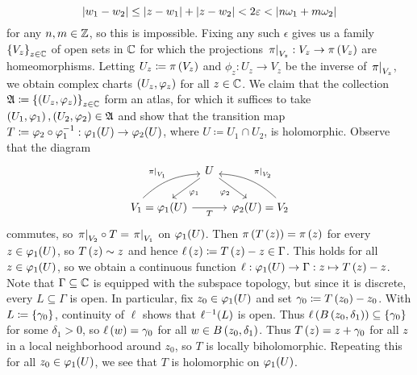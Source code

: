 \documentclass[../Moduli_Spaces_of_Riemann_Surfaces.tex]{subfiles}
\begin{document}
\begin{example}
\begin{equation*}
            \left|w_1-w_2\right|\leq\left|z-w_1\right|+\left|z-w_2\right|<2\varepsilon<\left|n\omega_1+m\omega_2\right|
        \end{equation*}
        for any $n,m\in\mathbb{Z}$, so this is impossible. Fixing any such $\epsilon$ gives us a family $\left\{V_z\right\}_{z\in\mathbb{C}}$ of open sets in $\mathbb{C}$ for which the projections $\left.\pi\right|_{V_z}:V_z\to\pi\left(V_z\right)$ are homeomorphisms. Letting $U_z\coloneqq\pi\left(V_z\right)$ and $\phi_z:U_z\to V_z$ be the inverse of $\left.\pi\right|_{V_z}$, we obtain complex charts $\left(U_z,\varphi_z\right)$ for all $z\in\mathbb{C}$. We claim that the collection $\mathfrak{A}\coloneqq\left\{\left(U_z,\varphi_z\right)\right\}_{z\in\mathbb{C}}$ form an atlas, for which it suffices to take $\left(U_1,\varphi_1\right),\left(U_2,\varphi_2\right)\in\mathfrak{A}$ and show that the transition map $T\coloneqq\varphi_2\circ\varphi_1^{-1}:\varphi_1\!\left(U\right)\to\varphi_2\!\left(U\right)$, where $U\coloneqq U_1\cap U_2$, is holomorphic. Observe that the diagram
        \begin{equation*}
            \begin{tikzcd}[column sep=0.1in]
                & U \ar[dl, "\phi_1"] \ar[dr, "\phi_2"'] \\
                V_1=\phi_1(U) \ar[ur, "\l.\pi\r|_{V_1}", bend left=20, start anchor={[xshift=-20px]}] \ar[rr, "T"'] & & \phi_2(U)=V_2 \ar[ul, "\l.\pi\r|_{V_2}"', bend right=20, start anchor={[xshift=20px]}]
            \end{tikzcd}
        \end{equation*}
        commutes, so $\left.\pi\right|_{V_2}\circ T=\left.\pi\right|_{V_1}$ on $\varphi_1\!\left(U\right)$. Then $\pi\left(T\left(z\right)\right)=\pi\left(z\right)$ for every $z\in\varphi_1\!\left(U\right)$, so $T\left(z\right)\sim z$ and hence $\ell\left(z\right)\coloneqq T\left(z\right)-z\in\Gamma$. This holds for all $z\in\varphi_1\!\left(U\right)$, so we obtain a continuous function $\ell:\varphi_1\!\left(U\right)\to\Gamma:z\mapsto T\left(z\right)-z$. Note that $\Gamma\subseteq\mathbb{C}$ is equipped with the subspace topology, but since it is discrete, every $L\subseteq\Gamma$ is open. In particular, fix $z_0\in\varphi_1\!\left(U\right)$ and set $\gamma_0\coloneqq T\left(z_0\right)-z_0$. With $L\coloneqq\left\{\gamma_0\right\}$, continuity of $\ell$ shows that $\ell^{-1}\!\left(L\right)$ is open. Thus $\ell\left(B\left(z_0,\delta_1\right)\right)\subseteq\left\{\gamma_0\right\}$ for some $\delta_1>0$, so $\ell\left(w\right)=\gamma_0$ for all $w\in B\left(z_0,\delta_1\right)$. Thus $T\left(z\right)=z+\gamma_0$ for all $z$ in a local neighborhood around $z_0$, so $T$ is locally biholomorphic. Repeating this for all $z_0\in\varphi_1\!\left(U\right)$, we see that $T$ is holomorphic on $\varphi_1\!\left(U\right)$.\exqed
    \end{example}
\end{document}
